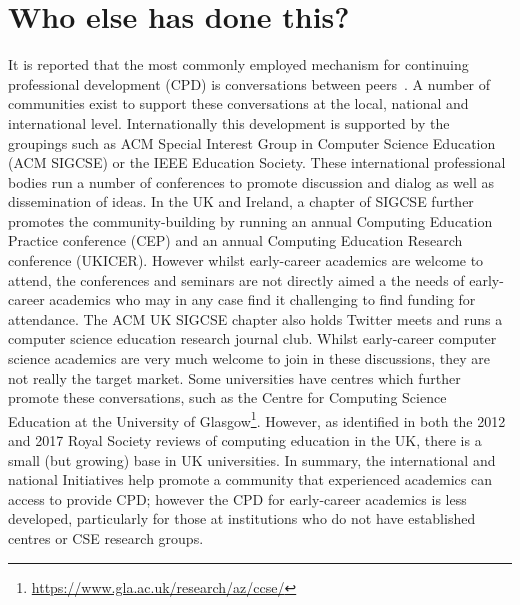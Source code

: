 \documentclass[sigconf]{acmart}
\begin{document}
\section{Who else has done this?}
It is reported that the most commonly employed mechanism for continuing professional development (CPD) is conversations between peers~\cite{King2004}. A number of communities exist to support these conversations at the local, national and international level. Internationally this development is supported by the groupings such as ACM Special Interest Group in Computer Science Education (ACM SIGCSE) or the IEEE Education Society. These international professional bodies run a number of conferences to promote discussion and dialog as well as dissemination of ideas. In the UK and Ireland, a chapter of SIGCSE further promotes the community-building by running an annual Computing Education Practice conference (CEP) and an annual Computing Education Research conference (UKICER). However whilst early-career academics are welcome to attend, the conferences and seminars are not directly aimed a the needs of early-career academics who may in any case find it challenging to find funding for attendance. The ACM UK SIGCSE chapter also holds Twitter meets and runs a computer science education research journal club. Whilst early-career computer science academics are very much welcome to join in these discussions, they are not really the target market. Some universities have centres which further promote these conversations, such as the Centre for Computing Science Education at the University of Glasgow\footnote{\url{https://www.gla.ac.uk/research/az/ccse/}}. However, as identified in both the 2012 and 2017 Royal Society reviews of computing education in the UK, there is a small (but growing) base in UK universities. In summary, the international and national Initiatives help promote a community that experienced academics can access to provide CPD; however the CPD for early-career academics is less developed, particularly for those at institutions who do not have established centres or CSE research groups.

\end{document}

